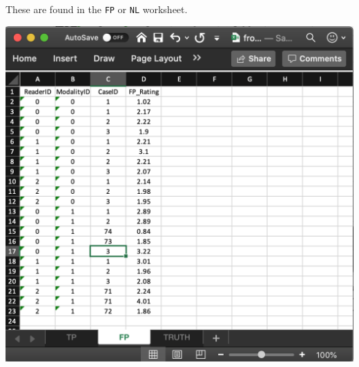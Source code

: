 \documentclass[
]{book}
\begin{document}
These are found in the \texttt{FP} or \texttt{NL} worksheet.

\includegraphics[width=1\textwidth,height=\textheight]{images/quick-start/frocCrNL.png}
\end{document}
